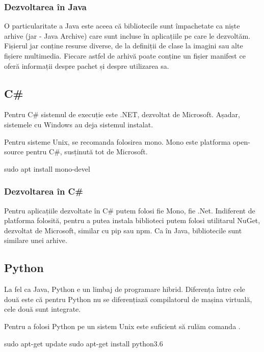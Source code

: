 \subsubsection{Dezvoltarea în Java}
\label{sec:appdev-ideinstall-java-dev}

O particularitate a Java este aceea că bibliotecile sunt împachetate ca niște
arhive (jar - Java Archive) care sunt incluse în aplicațiile pe care le
dezvoltăm. Fișierul jar conține resurse diverse, de la definiții de clase la
imagini sau alte fișiere multimedia. Fiecare astfel de arhivă poate conține un
fișier manifest ce oferă informații despre pachet și despre utilizarea sa.


\subsection{C\#}
\label{sec:appdev-ideinstall-cs}

Pentru C\# sistemul de execuție este .NET, dezvoltat de Microsoft. Așadar,
sistemele cu Windows au deja sistemul instalat.

Pentru sisteme Unix, se recomanda folosirea mono. Mono este platforma
open-source pentru C\#, susținută tot de Microsoft.

sudo apt install mono-devel

\subsubsection{Dezvoltarea în C\#}
\label{sec:appdev-ideinstall-cs-dev}

Pentru aplicațiile dezvoltate în C\# putem folosi fie Mono, fie .Net. Indiferent
de platforma folosită, pentru a putea instala biblioteci putem folosi utilitarul
NuGet, dezvoltat de Microsoft, similar cu pip sau npm. Ca în Java, bibliotecile
sunt similare unei arhive.

\subsection{Python}
\label{sec:appdev-ideinstall-python}

La fel ca Java, Python e un limbaj de programare hibrid. Diferența între cele
două este că pentru Python nu se diferențiază compilatorul de mașina virtuală,
cele două sunt integrate.

Pentru a folosi Python pe un sistem Unix este suficient să rulăm comanda
.

\begin{screen}
sudo apt-get update
sudo apt-get install python3.6
\end{screen}

